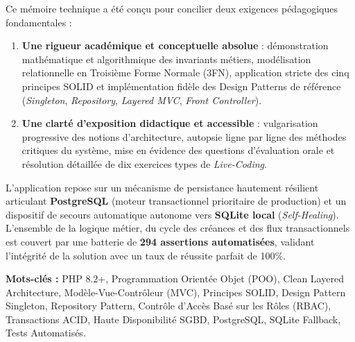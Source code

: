 \documentclass[11pt,a4paper,titlepage,twoside,openright]{report}
\begin{document}
Ce mémoire technique a été conçu pour concilier deux exigences pédagogiques fondamentales :
\begin{enumerate}
    \item \textbf{Une rigueur académique et conceptuelle absolue} : démonstration mathématique et algorithmique des invariants métiers, modélisation relationnelle en Troisième Forme Normale (3FN), application stricte des cinq principes SOLID et implémentation fidèle des Design Patterns de référence (\emph{Singleton}, \emph{Repository}, \emph{Layered MVC}, \emph{Front Controller}).
    \item \textbf{Une clarté d'exposition didactique et accessible} : vulgarisation progressive des notions d'architecture, autopsie ligne par ligne des méthodes critiques du système, mise en évidence des questions d'évaluation orale et résolution détaillée de dix exercices types de \emph{Live-Coding}.
\end{enumerate}

L'application repose sur un mécanisme de persistance hautement résilient articulant \textbf{PostgreSQL} (moteur transactionnel prioritaire de production) et un dispositif de secours automatique autonome vers \textbf{SQLite local} (\emph{Self-Healing}). L'ensemble de la logique métier, du cycle des créances et des flux transactionnels est couvert par une batterie de \textbf{294 assertions automatisées}, validant l'intégrité de la solution avec un taux de réussite parfait de 100\%.

\vspace{1cm}
\noindent\textbf{Mots-clés :} PHP 8.2+, Programmation Orientée Objet (POO), Clean Layered Architecture, Modèle-Vue-Contrôleur (MVC), Principes SOLID, Design Pattern Singleton, Repository Pattern, Contrôle d'Accès Basé sur les Rôles (RBAC), Transactions ACID, Haute Disponibilité SGBD, PostgreSQL, SQLite Fallback, Tests Automatisés.

\clearpage

\tableofcontents
\clearpage

\listoffigures
{}
\vspace{0.5cm}

\listoftables
{}
\vspace{0.5cm}
\end{document}
